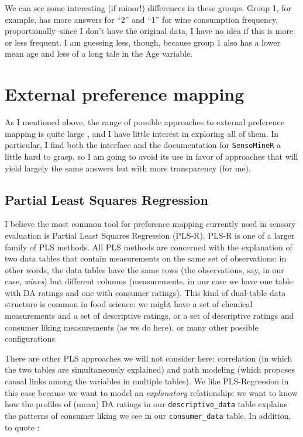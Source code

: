 \documentclass[
]{book}
\begin{document}
We can see some interesting (if minor!) differences in these groups. Group 1, for example, has more answers for ``2'' and ``1'' for wine consumption frequency, proportionally--since I don't have the original data, I have no idea if this is more or less frequent. I am guessing less, though, because group 1 also has a lower mean age and less of a long tale in the Age variable.

\section{External preference mapping}\label{external-preference-mapping}

As I mentioned above, the range of possible approaches to external preference mapping is quite large \citep{yenketCOMPARISON2011}, and I have little interest in exploring all of them. In particular, I find both the interface and the documentation for \texttt{SensoMineR} a little hard to grasp, so I am going to avoid its use in favor of approaches that will yield largely the same answers but with more transparency (for me).

\subsection{Partial Least Squares Regression}\label{partial-least-squares-regression}

I believe the most common tool for preference mapping currently used in sensory evaluation is Partial Least Squares Regression (PLS-R). PLS-R is one of a larger family of PLS methods. All PLS methods are concerned with the explanation of two data tables that contain measurements on the same set of observations: in other words, the data tables have the same rows (the observations, say, in our case, \emph{wines}) but different columns (measurements, in our case we have one table with DA ratings and one with consumer ratings). This kind of dual-table data structure is common in food science: we might have a set of chemical measurements and a set of descriptive ratings, or a set of descriptive ratings and consumer liking measurements (as we do here), or many other possible configurations.

There are other PLS approaches we will not consider here: correlation (in which the two tables are simultaneously explained) and path modeling (which proposes causal links among the variables in multiple tables). We like PLS-Regression in this case because we want to model an \emph{explanatory} relationship: we want to know how the profiles of (mean) DA ratings in our \texttt{descriptive\_data} table explains the patterns of consumer liking we see in our \texttt{consumer\_data} table. In addition, to quote \citet[p.567]{abdiPartial2013}:
\end{document}
